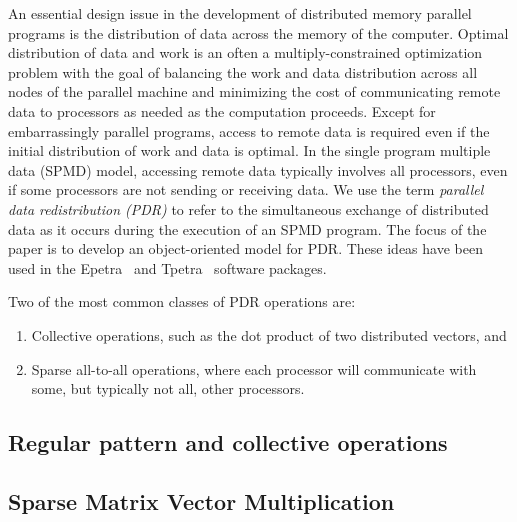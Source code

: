 \documentclass[12pt,relax]{PetraObjectModel}
\begin{document}
An essential design issue in the development of distributed memory parallel programs is the
distribution of data across the memory of the computer.  Optimal distribution of data and work
is an often a multiply-constrained optimization problem with the goal of balancing the work and
data distribution across all nodes of the parallel machine and minimizing the cost of
communicating remote data to processors as needed as the computation proceeds.
Except for embarrassingly parallel programs, access to remote data is required even if
the initial distribution of work and data is optimal.  In the single program multiple data
(SPMD) model, accessing remote data typically involves all processors, even if some processors
are not sending or receiving data.  We use the term {\it parallel data
redistribution (PDR)} to refer to the simultaneous exchange of distributed data as it occurs during
the execution of an SPMD program.  The focus of the paper is to develop an object-oriented
model for PDR.  These ideas have been used in the Epetra~\cite{Epetra-Ref-Manual} and
Tpetra~\cite{Tpetra-User-Guide} software packages.

Two of the most common classes of PDR operations are:
\begin{enumerate}
\item Collective operations, such as the dot
product of two distributed vectors, and 
\item Sparse all-to-all operations, where each processor will
communicate with some, but typically not all, other processors.
\end{enumerate}


\subsection{Regular pattern and collective operations}

\subsection{Sparse Matrix Vector Multiplication}
\end{document}
